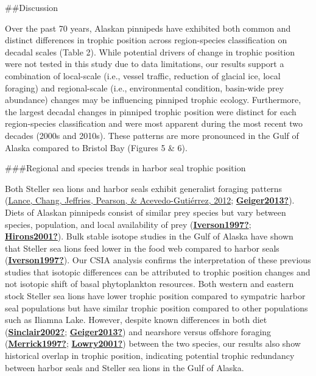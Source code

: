 \documentclass [11pt, proquest] {uwthesis}[2015/03/03]
\begin{document}
\#\#Discussion

Over the past 70 years, Alaskan pinnipeds have exhibited both common and distinct differences in trophic position across region-species classification on decadal scales (Table 2). While potential drivers of change in trophic position were not tested in this study due to data limitations, our results support a combination of local-scale (i.e., vessel traffic, reduction of glacial ice, local foraging) and regional-scale (i.e., environmental condition, basin-wide prey abundance) changes may be influencing pinniped trophic ecology. Furthermore, the largest decadal changes in pinniped trophic position were distinct for each region-species classification and were most apparent during the most recent two decades (2000s and 2010s). These patterns are more pronounced in the Gulf of Alaska compared to Bristol Bay (Figures 5 \& 6).

\#\#\#Regional and species trends in harbor seal trophic position

Both Steller sea lions and harbor seals exhibit generalist foraging patterns (\protect\hyperlink{ref-Lance2012}{Lance, Chang, Jeffries, Pearson, \& Acevedo-Gutiérrez, 2012}; \protect\hyperlink{ref-Geiger2013}{\textbf{Geiger2013?}}). Diets of Alaskan pinnipeds consist of similar prey species but vary between species, population, and local availability of prey (\protect\hyperlink{ref-Iverson1997}{\textbf{Iverson1997?}}; \protect\hyperlink{ref-Hirons2001}{\textbf{Hirons2001?}}). Bulk stable isotope studies in the Gulf of Alaska have shown that Steller sea lions feed lower in the food web compared to harbor seals (\protect\hyperlink{ref-Iverson1997}{\textbf{Iverson1997?}}). Our CSIA analysis confirms the interpretation of these previous studies that isotopic differences can be attributed to trophic position changes and not isotopic shift of basal phytoplankton resources. Both western and eastern stock Steller sea lions have lower trophic position compared to sympatric harbor seal populations but have similar trophic position compared to other populations such as Iliamna Lake. However, despite known differences in both diet (\protect\hyperlink{ref-Sinclair2002}{\textbf{Sinclair2002?}}; \protect\hyperlink{ref-Geiger2013}{\textbf{Geiger2013?}}) and nearshore versus offshore foraging (\protect\hyperlink{ref-Merrick1997}{\textbf{Merrick1997?}}; \protect\hyperlink{ref-Lowry2001}{\textbf{Lowry2001?}}) between the two species, our results also show historical overlap in trophic position, indicating potential trophic redundancy between harbor seals and Steller sea lions in the Gulf of Alaska.
\end{document}
